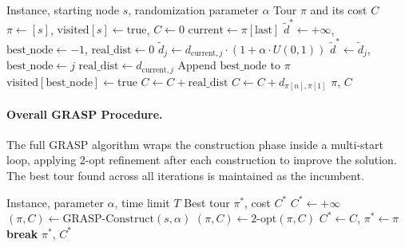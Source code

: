 \documentclass{article}
\begin{document}
\begin{algorithm}[H]
\caption{GRASP Construction Phase (Randomized Nearest Neighbor)}
\label{alg:grasp_constr}
\begin{algorithmic}[1]
\Require Instance, starting node $s$, randomization parameter $\alpha$
\Ensure Tour $\pi$ and its cost $C$
\State $\pi \leftarrow [s]$, $\text{visited}[s] \leftarrow \text{true}$, $C \leftarrow 0$
    \State $\text{current} \leftarrow \pi[\text{last}]$
    \State $\tilde{d}^* \leftarrow +\infty$, $\text{best\_node} \leftarrow -1$, $\text{real\_dist} \leftarrow 0$
        \State $\tilde{d}_j \leftarrow d_{\text{current},j} \cdot (1 + \alpha \cdot U(0,1))$
            \State $\tilde{d}^* \leftarrow \tilde{d}_j$, $\text{best\_node} \leftarrow j$
            \State $\text{real\_dist} \leftarrow d_{\text{current},j}$
        \EndIf
    \EndFor
    \State Append $\text{best\_node}$ to $\pi$
    \State $\text{visited}[\text{best\_node}] \leftarrow \text{true}$
    \State $C \leftarrow C + \text{real\_dist}$
\EndWhile
\State $C \leftarrow C + d_{\pi[n], \pi[1]}$
\State \Return $\pi$, $C$
\end{algorithmic}
\end{algorithm}

\paragraph{Overall GRASP Procedure.}
The full GRASP algorithm wraps the construction phase inside a multi-start loop, applying
2-opt refinement after each construction to improve the solution. The best tour found across
all iterations is maintained as the incumbent.

\begin{algorithm}[H]
\caption{GRASP for TSP}
\label{alg:grasp}
\begin{algorithmic}[1]
\Require Instance, parameter $\alpha$, time limit $T$
\Ensure Best tour $\pi^*$, cost $C^*$
\State $C^* \leftarrow +\infty$
    \State $(\pi, C) \leftarrow \text{GRASP-Construct}(s, \alpha)$
    \State $(\pi, C) \leftarrow \text{2-opt}(\pi, C)$
        \State $C^* \leftarrow C$, $\pi^* \leftarrow \pi$
    \EndIf
     \textbf{break} \EndIf
\EndFor
\State \Return $\pi^*$, $C^*$
\end{algorithmic}
\end{algorithm}
\end{document}
